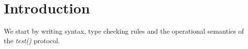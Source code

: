 
\section{Introduction}
We start by writing syntax, type checking rules and the operational semantics
of the \textit{test()} protocol. 
